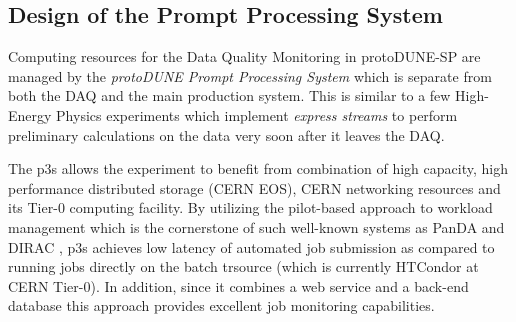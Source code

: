 \documentclass{webofc}
\newcommand{\pd}{protoDUNE\xspace}
\begin{document}
\subsection{Design of the Prompt Processing System}

Computing resources for the Data Quality Monitoring in \pd-SP are managed by
the  \textit{\pd Prompt Processing System}
which is separate from both the DAQ and the main production system.
This is similar to a few High-Energy Physics experiments which implement
 \textit{express streams} to perform preliminary calculations on the data very soon
after it leaves the DAQ.

The  p3s allows the experiment to benefit from combination of high capacity, high
performance distributed storage (CERN EOS), CERN networking resources and its Tier-0 computing facility.
By utilizing the pilot-based approach \cite{eps} to workload management which is the cornerstone of such well-known
systems as PanDA and DIRAC \cite{panda,dirac}, p3s achieves low latency of automated job submission
as compared to running jobs directly on the batch trsource (which is currently HTCondor at CERN Tier-0).
In addition, since it combines a web service and a back-end database this approach provides excellent
job monitoring capabilities.


\end{document}
